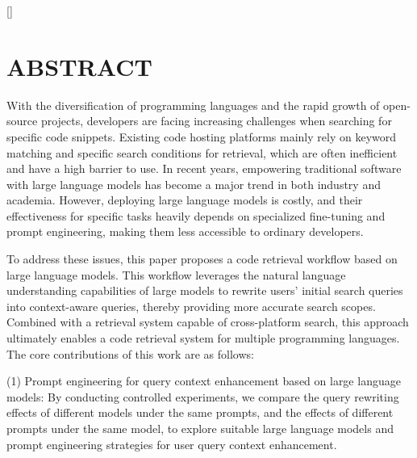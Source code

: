 \documentclass[UTF8,a4paper,12pt]{ctexart}
\numberwithin{equation}{section}
\renewcommand\thesection{\arabic{section}}
\begin{document}
\newpage
{}

\titleformat{\section}[block]{\centering\bfseries\fontspec{Times New Roman}\fontsize{16pt}{20pt}\selectfont}{\thesection}{1em}{}[]

\section*{ABSTRACT}
With the diversification of programming languages and the rapid growth of open-source projects, developers are facing increasing challenges when searching for specific code snippets. Existing code hosting platforms mainly rely on keyword matching and specific search conditions for retrieval, which are often inefficient and have a high barrier to use. In recent years, empowering traditional software with large language models has become a major trend in both industry and academia. However, deploying large language models is costly, and their effectiveness for specific tasks heavily depends on specialized fine-tuning and prompt engineering, making them less accessible to ordinary developers.\par

To address these issues, this paper proposes a code retrieval workflow based on large language models. This workflow leverages the natural language understanding capabilities of large models to rewrite users’ initial search queries into context-aware queries, thereby providing more accurate search scopes. Combined with a retrieval system capable of cross-platform search, this approach ultimately enables a code retrieval system for multiple programming languages. The core contributions of this work are as follows:\par

(1) Prompt engineering for query context enhancement based on large language models: By conducting controlled experiments, we compare the query rewriting effects of different models under the same prompts, and the effects of different prompts under the same model, to explore suitable large language models and prompt engineering strategies for user query context enhancement.\par
\end{document}
